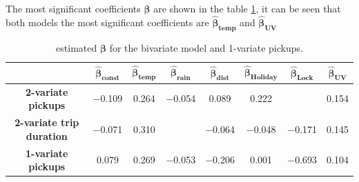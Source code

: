\noindent
The most significant coefficients $\boldsymbol{\hat{\beta}}$ are shown in the  table \ref{z_latent trend}, it can be seen that both models the most significant coefficients are $\boldsymbol{\hat{\beta}_{temp}}$ and $\boldsymbol{\hat{\beta}_{UV}}$
 \begin{table}
	\centering
	\renewcommand\arraystretch{1.3}
	\begin{tabular}{c|c|c|c|c|c|c|c}
		\hline
		\textit{} & $\boldsymbol{\hat{\beta}_{const}}$ & $\boldsymbol{\hat{\beta}_{temp}}$ & $\boldsymbol{\hat{\beta}_{rain}}$ & $\boldsymbol{\hat{\beta}_{dist}}$ & $\boldsymbol{\hat{\beta}_{Holiday}}$ & $\boldsymbol{\hat{\beta}_{Lock}}$ & $\boldsymbol{\hat{\beta}_{UV}}$   \\
		\hline
		\textbf{2-variate pickups} & \num{-0.109} & \num{+0.264} & \num{-0.054} & \num{+0.089} & \num{+0.222} &  & \num{+0.154}  \\
		\hline
		\textbf{2-variate trip duration} & \num{-0.071} & \num{+0.310} &  & \num{-0.064} & \num{-0.048} & \num{-0.171} & \num{+0.145}  \\
		\hline
		\textbf{1-variate pickups} & \num{+0.079} & \num{+0.269} & \num{-0.053} & \num{-0.206} & \num{+0.001} & \num{-0.693} & \num{+0.104}\\
		\hline
	\end{tabular}
	\caption[Estimated $\boldsymbol{\beta}$ for the bivariate model and 1-variate pickups (DCM)]{estimated $\boldsymbol{\beta}$ for the bivariate model and \num{1}-variate pickups.}
	\label{z_latent trend}
\end{table}